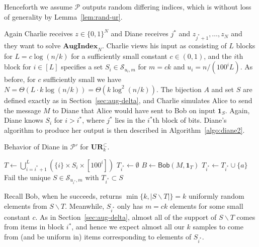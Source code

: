 \documentclass[11pt]{article}
\newcommand{\diane}{\mathsf{Diane}}
\newcommand{\aug}{\mathbf{AugIndex}\xspace}
\newcommand{\query}{\mathsf{Bob}}
\newcommand{\ur}{\mathbf{UR}\xspace}
\begin{document}
Henceforth we assume $\mathcal P$ outputs random differing indices, which is without loss of generality by Lemma~\ref{lem:rand-ur}.


Again Charlie receives $z\in\{0,1\}^N$ and Diane receives $j^*$ and $z_{j^*+1},\ldots,z_N$ and they want to solve $\aug_N$. Charlie views his input as consisting of $L$ blocks for $L = c\log(n/k)$ for a sufficiently small constant $c\in(0,1)$, and the $i$th block for $i\in[L]$ specifies a set $S_i \in \mathcal S_{u_i,m}$ for $m = ck$ and $u_i = n/(100^i L)$. As before, for $c$ sufficiently small we have $N = \Theta(L\cdot k\log(n/k)) = \Theta(k\log^2(n/k))$. The bijection $A$ and set $S$ are defined exactly as in Section~\ref{sec:aug-delta}, and Charlie simulates Alice to send the message $M$ to Diane that Alice would have sent to Bob on input $\mathbf{1}_S$. Again, Diane knows $S_i$ for $i>i^*$, where $j^*$ lies in the $i^*$th block of bits. Diane's algorithm to produce her output is then described in Algorithm~\ref{algo:diane2}.

\begin{algorithm}%
  \caption{Behavior of Diane in $\mathcal P'$ for $\ur_k^\subset$.} \label{algo:diane2}
  \begin{algorithmic}[1]
    \Procedure{$\diane$}{$M$}
    \State $T \leftarrow \bigcup_{i=i^*+1}^L (\{i\} \times S_i \times [100^i])$
    \State $T_{i^*}\leftarrow \emptyset$
    \State $B\leftarrow \query(M, \mathbf{1}_T)$
        \State $T_{i^*} \leftarrow T_{i^*}\cup \{a\}$
      \EndIf
    \EndFor
      \State \Return \textsf{Fail}
    \Else
      \State \Return the unique $S\in \mathcal S_{u_{i^*},m}$ with $T_{i^*}\subset S$ 
    \EndIf
    \EndProcedure
  \end{algorithmic}
\end{algorithm}

Recall Bob, when he succeeds, returns $\min\{k, |S\backslash T|\} = k$ uniformly random elements from $S\backslash T$. Meanwhile, $S_{i^*}$ only has $m = ck$ elements for some small constant $c$. As in Section~\ref{sec:aug-delta}, almost all of the support of $S\backslash T$ comes from items in block $i^*$, and hence we expect almost all our $k$ samples to come from (and be uniform in) items corresponding to elements of $S_{i^*}$. 
\end{document}
